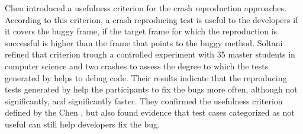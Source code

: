Chen \etal \cite{Chen2015} introduced a usefulness criterion for the crash reproduction approaches. 
According to this criterion, a crash reproducing test is useful to the developers if it covers the buggy frame, \ie if the target frame for which the reproduction is successful is higher than the frame that points to the buggy method.
Soltani \etal \cite{Soltani2018a} refined that criterion trough a controlled experiment with 35 master students in computer science and two crashes to assess the degree to which the tests generated by \evocrash helps to debug code. 
Their results indicate that the reproducing tests generated by \evocrash help the participants to fix the bugs more often, although not significantly, and significantly faster. 
They confirmed the usefulness criterion defined by the Chen \etal \cite{Chen2015}, but also found evidence that test cases categorized as not useful can still help developers fix the bug.


